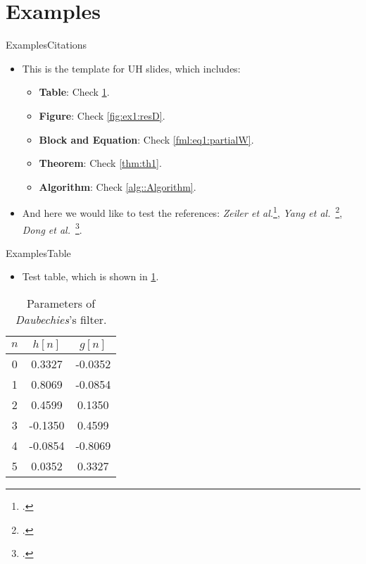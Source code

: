 \documentclass[10pt,xcolor={dvipsnames},aspectratio=169]{beamer}
\begin{document}
\section{Examples}
\begin{frame}{Examples}{Citations}
\begin{itemize}
  \item This is the template for UH slides, which includes:
  \begin{itemize}
    \item \textbf{Table}: Check \cref{tab:params}.
    \item \textbf{Figure}: Check \cref{fig:ex1:resD}.
    \item \textbf{Block and Equation}: Check \eqref{fml:eq1:partialW}.
    \item \textbf{Theorem}: Check \cref{thm:th1}.
    \item \textbf{Algorithm}: Check \cref{alg::Algorithm}.
  \end{itemize}
  \item And here we would like to test the references: \textit{Zeiler et al.}\footcite{Zeiler5539957}, \textit{Yang et al.}~\footcite{Yang6175956}, \textit{Dong et al.}~\footcite{Dong7115171}.
\end{itemize}
\end{frame}


\begin{frame}{Examples}{Table}
\begin{itemize}
  \item Test table, which is shown in \cref{tab:params}.
\end{itemize}

\begin{table}[htbp]
  \centering
  \normalsize
  \caption[Parameters of Daubechies's filter.]{Parameters of \textit{Daubechies}'s filter.}
  \label{tab:params}
  \begin{tabular}{|c|c|c|}
    \hline
    $n$ & $h[n]$ & $g[n]$ \\ \hline
    0 &  0.3327 & -0.0352 \\ \hline
    1 &  0.8069 & -0.0854 \\ \hline
    2 &  0.4599 &  0.1350 \\ \hline
    3 & -0.1350 &  0.4599 \\ \hline
    4 & -0.0854 & -0.8069 \\ \hline
    5 &  0.0352 &  0.3327 \\ \hline
  \end{tabular}
\end{table}
\end{frame}
\end{document}
